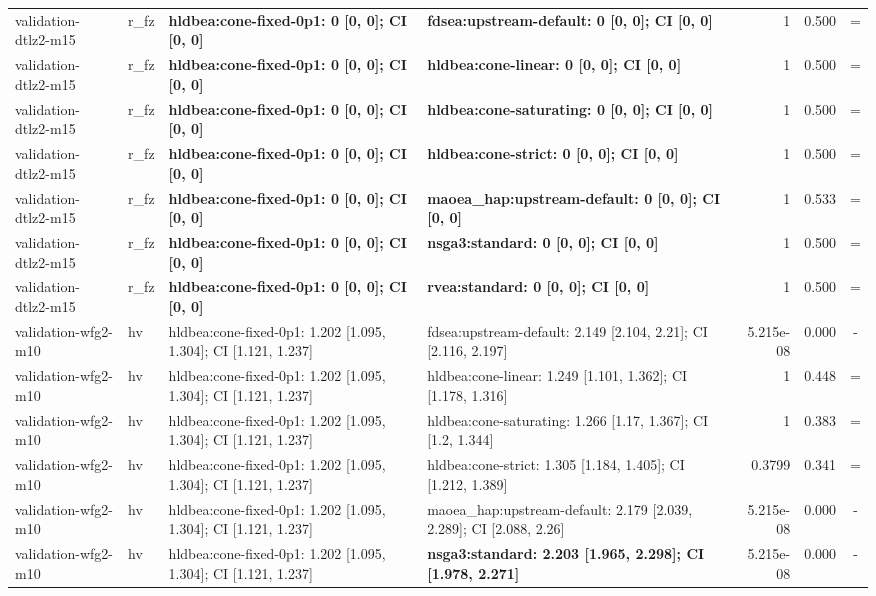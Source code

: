 \begin{tabular}{llllrrc}
validation-dtlz2-m15 & r\_fz & \textbf{hldbea:cone-fixed-0p1: 0 [0, 0]; CI [0, 0]} & \textbf{fdsea:upstream-default: 0 [0, 0]; CI [0, 0]} & 1 & 0.500 & = \\
validation-dtlz2-m15 & r\_fz & \textbf{hldbea:cone-fixed-0p1: 0 [0, 0]; CI [0, 0]} & \textbf{hldbea:cone-linear: 0 [0, 0]; CI [0, 0]} & 1 & 0.500 & = \\
validation-dtlz2-m15 & r\_fz & \textbf{hldbea:cone-fixed-0p1: 0 [0, 0]; CI [0, 0]} & \textbf{hldbea:cone-saturating: 0 [0, 0]; CI [0, 0]} & 1 & 0.500 & = \\
validation-dtlz2-m15 & r\_fz & \textbf{hldbea:cone-fixed-0p1: 0 [0, 0]; CI [0, 0]} & \textbf{hldbea:cone-strict: 0 [0, 0]; CI [0, 0]} & 1 & 0.500 & = \\
validation-dtlz2-m15 & r\_fz & \textbf{hldbea:cone-fixed-0p1: 0 [0, 0]; CI [0, 0]} & \textbf{maoea\_hap:upstream-default: 0 [0, 0]; CI [0, 0]} & 1 & 0.533 & = \\
validation-dtlz2-m15 & r\_fz & \textbf{hldbea:cone-fixed-0p1: 0 [0, 0]; CI [0, 0]} & \textbf{nsga3:standard: 0 [0, 0]; CI [0, 0]} & 1 & 0.500 & = \\
validation-dtlz2-m15 & r\_fz & \textbf{hldbea:cone-fixed-0p1: 0 [0, 0]; CI [0, 0]} & \textbf{rvea:standard: 0 [0, 0]; CI [0, 0]} & 1 & 0.500 & = \\
validation-wfg2-m10 & hv & hldbea:cone-fixed-0p1: 1.202 [1.095, 1.304]; CI [1.121, 1.237] & fdsea:upstream-default: 2.149 [2.104, 2.21]; CI [2.116, 2.197] & 5.215e-08 & 0.000 & - \\
validation-wfg2-m10 & hv & hldbea:cone-fixed-0p1: 1.202 [1.095, 1.304]; CI [1.121, 1.237] & hldbea:cone-linear: 1.249 [1.101, 1.362]; CI [1.178, 1.316] & 1 & 0.448 & = \\
validation-wfg2-m10 & hv & hldbea:cone-fixed-0p1: 1.202 [1.095, 1.304]; CI [1.121, 1.237] & hldbea:cone-saturating: 1.266 [1.17, 1.367]; CI [1.2, 1.344] & 1 & 0.383 & = \\
validation-wfg2-m10 & hv & hldbea:cone-fixed-0p1: 1.202 [1.095, 1.304]; CI [1.121, 1.237] & hldbea:cone-strict: 1.305 [1.184, 1.405]; CI [1.212, 1.389] & 0.3799 & 0.341 & = \\
validation-wfg2-m10 & hv & hldbea:cone-fixed-0p1: 1.202 [1.095, 1.304]; CI [1.121, 1.237] & maoea\_hap:upstream-default: 2.179 [2.039, 2.289]; CI [2.088, 2.26] & 5.215e-08 & 0.000 & - \\
validation-wfg2-m10 & hv & hldbea:cone-fixed-0p1: 1.202 [1.095, 1.304]; CI [1.121, 1.237] & \textbf{nsga3:standard: 2.203 [1.965, 2.298]; CI [1.978, 2.271]} & 5.215e-08 & 0.000 & - \\

\end{tabular}
